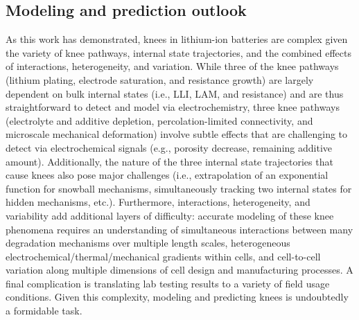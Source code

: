 \documentclass[journal=jpclcd,manuscript=article]{achemso}
\newcommand{\gbox}[1]{{
\fbox{
\parbox{0.8\textwidth}{  \fbox{$\triangleright$\textcolor{blue}{\textbf{Gon}:}} 
#1
}}}}
\newcommand{\pbox}[1]{{
\fbox{
\parbox{0.8\textwidth}{  \fbox{$\triangleright$\textcolor{blue}{\textbf{Peter}:}} 
#1
}}}}
\begin{document}





\subsection{Modeling and prediction outlook}


As this work has demonstrated, knees in lithium-ion batteries are complex given the variety of knee pathways, internal state trajectories, and the combined effects of interactions, heterogeneity, and variation. While three of the knee pathways (lithium plating, electrode saturation, and resistance growth) are largely dependent on bulk internal states (i.e., LLI, LAM, and resistance) and are thus straightforward to detect and model via electrochemistry, three knee pathways (electrolyte and additive depletion, percolation-limited connectivity, and microscale mechanical deformation) involve subtle effects that are challenging to detect via electrochemical signals (e.g., porosity decrease, remaining additive amount). 
Additionally, the nature of the three internal state trajectories that cause knees also pose major challenges (i.e., extrapolation of an exponential function for snowball mechanisms, simultaneously tracking two internal states for hidden mechanisms, etc.).
Furthermore, interactions, heterogeneity, and variability add additional layers of difficulty: accurate modeling of these knee phenomena requires an understanding of simultaneous interactions between many degradation mechanisms over multiple length scales, heterogeneous electrochemical/thermal/mechanical gradients within cells, and cell-to-cell variation along multiple dimensions of cell design and manufacturing processes.
A final complication is translating lab testing results to a variety of field usage conditions.
Given this complexity, modeling and predicting knees is undoubtedly a formidable task.
\end{document}
